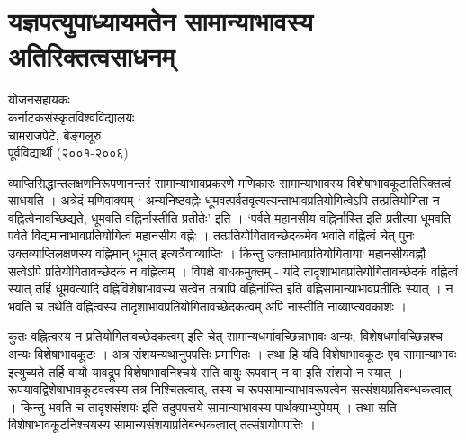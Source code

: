 \chapter{यज्ञपत्युपाध्यायमतेन सामान्याभावस्य अतिरिक्तत्वसाधनम्}

\begin{center}
\smallskip

योजनसहायकः\\
कर्नाटकसंस्कृतविश्वविद्यालयः\\
चामराजपेटे, बेङ्गलूरु\\
पूर्वविद्यार्थी (२००१-२००६)
\end{center}

व्याप्तिसिद्धान्तलक्षणनिरूपणानन्तरं सामान्याभावप्रकरणे मणिकारः  सामान्याभावस्य विशेषाभावकूटातिरिक्तत्वं साधयति । अत्रेदं मणिवाक्यम् ‘ अन्यनिष्ठवह्नेः धूमवत्पर्वतवृत्यत्यन्ताभावप्रतियोगित्वेऽपि तत्प्रतियोगिता न वह्नित्वेनावच्छिद्यते, धूमवति वह्निर्नास्तीति प्रतीतेः’ इति । ‘पर्वते महानसीय वह्निर्नास्ति इति प्रतीत्या धूमवति पर्वते विद्यमानाभावप्रतियोगित्वं महानसीय वह्नेः । तत्प्रतियोगितावच्छेदकमेव भवति वह्नित्वं चेत् पुनः उक्तव्याप्तिलक्षणस्य वह्निमान् धूमात् इत्यत्रैवाव्याप्तिः । किन्तु उक्ताभावप्रतियोगितायाः महानसीयवह्नौ सत्वेऽपि प्रतियोगितावच्छेदकं न वह्नित्वम् । विपक्षे बाधकमुक्तम् - यदि तादृशाभावप्रतियोगितावच्छेदकं वह्नित्वं स्यात् तर्हि धूमवत्यादि वह्निविशेषाभावस्य सत्वेन तत्रापि वह्निर्नास्ति इति वह्निसामान्याभावप्रतीतिः स्यात् । न भवति च तथेति वह्नित्वस्य तादृशाभावप्रतियोगितावच्छेदकत्वम् अपि नास्तीति नाव्याप्त्यवकाशः ।  

कुतः वह्नित्वस्य न प्रतियोगितावच्छेदकत्वम् इति चेत् सामान्यधर्मावच्छिन्नाभावः अन्यः, विशेषधर्मावच्छिन्नश्च अन्यः विशेषाभावकूटः । अत्र संशयन्यथानुपपत्तिः प्रमाणितः । तथा हि यदि विशेषाभावकूटः एव सामान्याभावः इत्युच्यते तर्हि वायौ यावद्रूप विशेषाभावनिश्चये सति वायुः रूपवान् न वा इति संशयो न स्यात् । रूपयावद्विशेषाभावकूटवत्वस्य तत्र निश्चितत्वात्, तस्य च रूपसामान्याभावरूपत्वेन सत्संशयप्रतिबन्धकत्वात् । किन्तु भवति च तादृशसंशयः इति तदुपपत्तये सामान्याभावस्य पार्थक्याभ्युपेयम् । तथा सति विशेषाभावकूटनिश्चयस्य सामान्यसंशयाप्रतिबन्धकत्वात् तत्संशयोपपत्तिः ।

